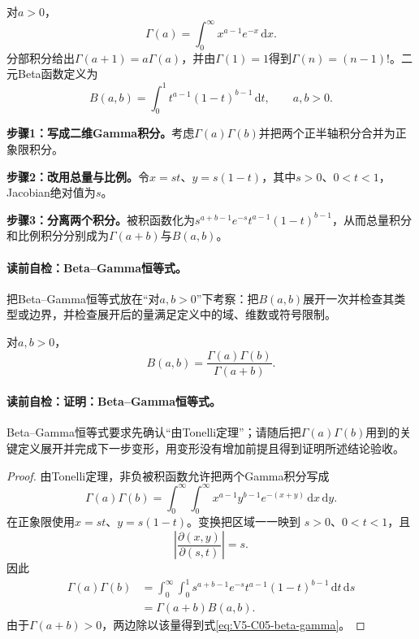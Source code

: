对$a>0$，
\begin{equation}\label{eq:V5-C05-gamma-definition}
\Gamma(a)=\int_0^\infty x^{a-1}e^{-x}\,\mathrm dx.
\end{equation}
分部积分给出$\Gamma(a+1)=a\Gamma(a)$，并由$\Gamma(1)=1$得到$\Gamma(n)=(n-1)!$。二元Beta函数定义为
\begin{equation}\label{eq:V5-C05-beta-definition}
B(a,b)=\int_0^1 t^{a-1}(1-t)^{b-1}\,\mathrm dt,
\qquad a,b>0.
\end{equation}

\textbf{步骤1：写成二维Gamma积分。}考虑$\Gamma(a)\Gamma(b)$并把两个正半轴积分合并为正象限积分。\par
\textbf{步骤2：改用总量与比例。}令$x=st$、$y=s(1-t)$，其中$s>0$、$0<t<1$，Jacobian绝对值为$s$。\par
\textbf{步骤3：分离两个积分。}被积函数化为$s^{a+b-1}e^{-s}t^{a-1}(1-t)^{b-1}$，从而总量积分和比例积分分别成为$\Gamma(a+b)$与$B(a,b)$。

\label{struct:V5-C05-CH12}
\paragraph{读前自检：Beta--Gamma恒等式。}把Beta--Gamma恒等式放在“对$a,b>0$”下考察：把$B(a,b)$展开一次并检查其类型或边界，并检查展开后的量满足定义中的域、维数或符号限制。\par

\begin{theorem}\label{thm:V5-C05-beta-gamma}
对$a,b>0$，
\begin{equation}\label{eq:V5-C05-beta-gamma}
B(a,b)=\frac{\Gamma(a)\Gamma(b)}{\Gamma(a+b)}.
\end{equation}
\end{theorem}

\label{struct:V5-C05-CH13}
\paragraph{读前自检：证明：Beta--Gamma恒等式。}Beta--Gamma恒等式要求先确认“由Tonelli定理”；请随后把$\Gamma(a)\Gamma(b)$用到的关键定义展开并完成下一步变形，用变形没有增加前提且得到证明所述结论验收。\par

\begin{proof}
由Tonelli定理，非负被积函数允许把两个Gamma积分写成
\[
\Gamma(a)\Gamma(b)
=\int_0^\infty\!\!\int_0^\infty
x^{a-1}y^{b-1}e^{-(x+y)}\,\mathrm dx\,\mathrm dy.
\]
在正象限使用$x=st$、$y=s(1-t)$。变换把区域一一映到
$s>0$、$0<t<1$，且
\[
\left|\frac{\partial(x,y)}{\partial(s,t)}\right|=s.
\]
因此
\begin{align*}
\Gamma(a)\Gamma(b)
&=\int_0^\infty\!\!\int_0^1
s^{a+b-1}e^{-s}t^{a-1}(1-t)^{b-1}
\,\mathrm dt\,\mathrm ds\\
&=\Gamma(a+b)B(a,b).
\end{align*}
由于$\Gamma(a+b)>0$，两边除以该量得到式\eqref{eq:V5-C05-beta-gamma}。
\end{proof}

